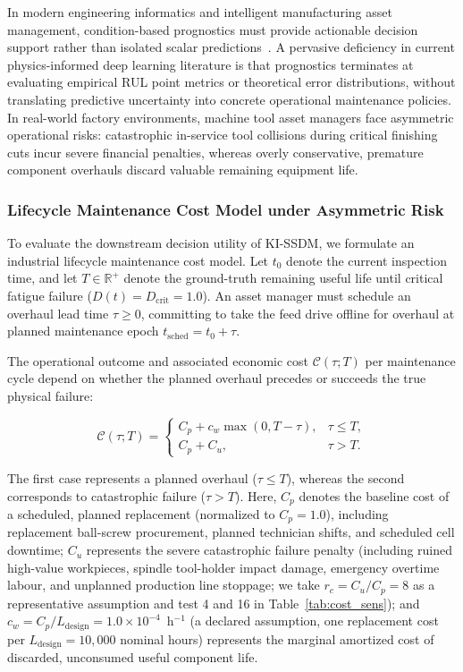 \documentclass[a4paper,fleqn]{cas-dc}
\newcommand{\Dcrit}{D_{\mathrm{crit}}}
\newcommand{\R}{\mathbb{R}}
\begin{document}
In modern engineering informatics and intelligent manufacturing asset management, condition-based prognostics must provide actionable decision support rather than isolated scalar predictions~\cite{Aivaliotis_2021, D_He_2025}. A pervasive deficiency in current physics-informed deep learning literature is that prognostics terminates at evaluating empirical RUL point metrics or theoretical error distributions, without translating predictive uncertainty into concrete operational maintenance policies. In real-world factory environments, machine tool asset managers face asymmetric operational risks: catastrophic in-service tool collisions during critical finishing cuts incur severe financial penalties, whereas overly conservative, premature component overhauls discard valuable remaining equipment life.

\subsubsection{Lifecycle Maintenance Cost Model under Asymmetric Risk}
To evaluate the downstream decision utility of KI-SSDM, we formulate an industrial lifecycle maintenance cost model. Let $t_0$ denote the current inspection time, and let $T \in \R^+$ denote the ground-truth remaining useful life until critical fatigue failure ($D(t) = \Dcrit = 1.0$). An asset manager must schedule an overhaul lead time $\tau \ge 0$, committing to take the feed drive offline for overhaul at planned maintenance epoch $t_{\mathrm{sched}} = t_0 + \tau$.

The operational outcome and associated economic cost $\mathcal{C}(\tau; T)$ per maintenance cycle depend on whether the planned overhaul precedes or succeeds the true physical failure:

\begin{equation}
\label{eq:cost_model}
\mathcal{C}(\tau;T)=
\begin{cases}
C_p+c_w\max(0,T-\tau),
& \tau\leq T,\\[3pt]
C_p+C_u,
& \tau>T.
\end{cases}
\end{equation}

The first case represents a planned overhaul ($\tau\leq T$), whereas the second corresponds to catastrophic failure ($\tau>T$). Here, $C_p$ denotes the baseline cost of a scheduled, planned replacement (normalized to $C_p = 1.0$), including replacement ball-screw procurement, planned technician shifts, and scheduled cell downtime; $C_u$ represents the severe catastrophic failure penalty (including ruined high-value workpieces, spindle tool-holder impact damage, emergency overtime labour, and unplanned production line stoppage; we take $r_c = C_u / C_p = 8$ as a representative assumption and test 4 and 16 in Table~\ref{tab:cost_sens}); and $c_w = C_p / L_{\mathrm{design}} = 1.0 \times 10^{-4}$~h$^{-1}$ (a declared assumption, one replacement cost per $L_{\mathrm{design}} = 10{,}000$ nominal hours) represents the marginal amortized cost of discarded, unconsumed useful component life.
\end{document}
